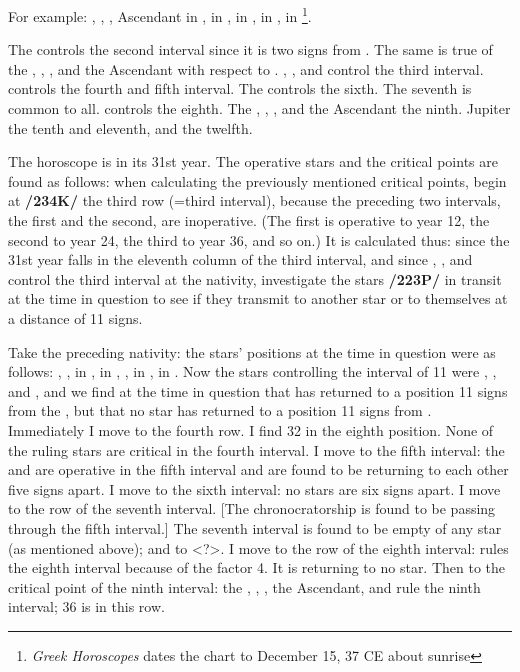 \noindent For example: \Sun, \Mars, \Mercury, Ascendant in \Sagittarius, \Moon\xspace in \Leo, \Saturn\xspace in \Virgo, \Jupiter\xspace in \Scorpio, \Venus\xspace in \Capricorn\footnote{\textit{Greek Horoscopes} dates the chart to December 15, 37 CE about sunrise}. 

The \Moon\xspace controls the second interval since it is two signs from \Saturn. The same is true of the \Sun, \Mars, \Mercury, and the Ascendant with respect to \Venus. \Saturn, \Jupiter, and \Venus\xspace control the third interval. \Saturn\xspace controls the fourth and fifth interval. The \Moon\xspace controls the sixth. The seventh is common to all. \Venus\xspace controls the eighth. The \Sun, \Mars, \Mercury, and the Ascendant the ninth. Jupiter the tenth and eleventh, and \Venus\xspace the twelfth. 

The horoscope is in its 31st year. The operative stars and the critical points are found as follows: when calculating the previously mentioned critical points, begin at \textbf{/234K/} the third row (=third interval), because the preceding two intervals, the first and the second, are inoperative. (The first is operative to year 12, the second to year 24,
the third to year 36, and so on.) It is calculated thus: since the 31st year falls in the eleventh column of the third interval, and since \Saturn, \Jupiter, and \Venus\xspace control the third interval at the nativity, investigate the stars \textbf{/223P/} in transit at the time in question to see if they transmit to another star or to themselves at a
distance of 11 signs. 

Take the preceding nativity: the stars’ positions at the time in question were as follows: \Sun, \Jupiter, \Mercury\xspace in \Gemini, \Saturn\xspace in \Virgo, \Mars, \Venus\xspace in \Taurus, \Moon\xspace in \Pisces. Now the stars controlling the interval of 11 were \Saturn, \Jupiter, and \Venus, and we find at the time in question
that \Venus\xspace has returned to a position 11 signs from the \Moon, but that no star has returned to a position 11 signs from \Jupiter. Immediately I move to the fourth row. I find 32 in the eighth position. None of the ruling stars are critical in the fourth interval. I move to the fifth interval: the \Moon\xspace and \Saturn\xspace are operative
in the fifth interval and are found to be returning to each other five signs apart. I move to the sixth interval: no stars are six signs apart. I move to the row of the seventh interval. [The chronocratorship is found to be passing through the fifth interval.] The seventh interval is found to be empty of any star (as mentioned above); \Mars\xspace and \Venus\xspace to \Saturn\xspace <?>. I move to the row of the eighth interval: \Venus\xspace rules the eighth interval because of the factor 4. It is returning to no star. Then to the critical point of the ninth interval: the \Sun, \Mars, \Mercury, the Ascendant, and \Venus\xspace rule the ninth interval; 36 is in this row. 

